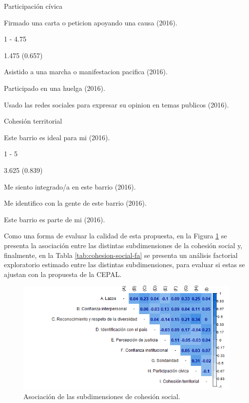 \documentclass[
  12pt,
]{book}
\begin{document}
Participación cívica

Firmado una carta o peticion apoyando una causa (2016).

1 - 4.75

1.475 (0.657)

Asistido a una marcha o manifestacion pacifica (2016).

Participado en una huelga (2016).

Usado las redes sociales para expresar su opinion en temas publicos (2016).

Cohesión territorial

Este barrio es ideal para mi (2016).

1 - 5

3.625 (0.839)

Me siento integrado/a en este barrio (2016).

Me identifico con la gente de este barrio (2016).

Este barrio es parte de mi (2016).

Como una forma de evaluar la calidad de esta propuesta, en la Figura \ref{fig:cohesion-social-cor} se presenta la asociación entre las distintas subdimensiones de la cohesión social y, finalmente, en la Tabla \ref{tab:cohesion-social-fa} se presenta un análisis factorial exploratorio estimado entre las distintas subdimensiones, para evaluar si estas se ajustan con la propuesta de la CEPAL.

\begin{figure}[H]

{\centering \includegraphics[width=1\linewidth,height=1\textheight]{output/graphs/cohesion_social_cor} 

}

\caption{Asociación de las subdimensiones de cohesión social.}\label{fig:cohesion-social-cor}
\end{figure}
\end{document}
